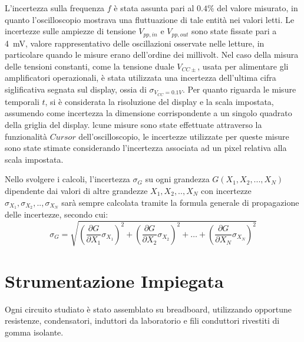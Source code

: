 \documentclass[a4paper,12pt]{article}
\begin{document}

L'incertezza sulla frequenza \( f \) è stata assunta pari al \( 0.4\% \) del valore misurato, in quanto l'oscilloscopio mostrava una fluttuazione di tale entità nei valori letti. Le incertezze sulle ampiezze di tensione \( V_{pp,in} \) e \( V_{pp,out} \) sono state fissate pari a \SI{4}{\milli\volt}, valore rappresentativo delle oscillazioni osservate nelle letture, in particolare quando le misure erano dell’ordine dei millivolt. Nel caso della misura delle tensioni constanti, come la tensione duale \(V_{CC\pm} \), usata per alimentare gli amplificatori operazionali, è stata utilizzata una incertezza dell'ultima cifra siglificativa segnata sul display, ossia di \(\sigma_{V_{CC} = 0.1 V}\). Per quanto riguarda le misure temporali \( t \), si è considerata la risoluzione del display e la scala impostata, assumendo come incertezza la dimensione corrispondente a un singolo quadrato della griglia del display. lcune misure sono state effettuate attraverso la funzionalità  \(Cursor\) dell'oscilloscopio, le incertezze utilizzate per queste misure sono state stimate considerando l'incertezza associata ad un pixel relativa alla scala impostata.

Nello svolgere i calcoli, l'incertezza $\sigma_G$ su ogni grandezza $G(X_1,X_2,...,X_N)$ dipendente dai valori di altre grandezze $X_1,X_2,..,X_N$ con incertezze $\sigma_{X_1}, \sigma_{X_2},..,\sigma_{X_N}$ sarà sempre calcolata tramite la formula generale di propagazione delle incertezze, secondo cui:
\begin{equation}
    \sigma_G = \sqrt{\left( \frac{\partial G}{\partial X_1} \sigma_{X_1} \right)^2 + \left( \frac{\partial G}{\partial X_2} \sigma_{X_2} \right)^2 + \dots + \left( \frac{\partial G}{\partial X_N} \sigma_{X_N} \right)^2}
\end{equation}

\section{Strumentazione Impiegata}
Ogni circuito studiato è stato assemblato su breadboard, utilizzando opportune resistenze, condensatori, induttori da laboratorio e fili conduttori rivestiti di gomma isolante.
\end{document}
